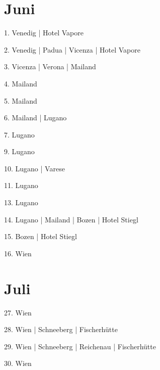 \documentclass[twoside=false,titlepage=false,open=any, parskip=never, fontsize=10pt, headings=small, chapterprefix=false, appendixprefix=false, DIV=15]{scrbook}
\begin{document}
\begin{multicols}{3}
            \section*{Juni}
            1. Venedig | Hotel Vapore\par
            2. Venedig | Padua | Vicenza | Hotel Vapore\par
            3. Vicenza | Verona | Mailand\par
            4. Mailand\par
            5. Mailand\par
            6. Mailand | Lugano\par
            7. Lugano\par
            9. Lugano\par
            10. Lugano | Varese\par
            11. Lugano\par
            13. Lugano\par
            14. Lugano | Mailand | Bozen | Hotel Stiegl\par
            15. Bozen | Hotel Stiegl\par
            16. Wien\par
            \section*{Juli}
            27. Wien\par
            28. Wien | Schneeberg | Fischerhütte\par
            29. Wien | Schneeberg | Reichenau | Fischerhütte\par
            30. Wien\par

\end{multicols}
\end{document}
